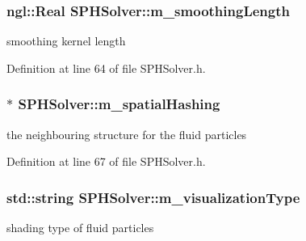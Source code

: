 \hypertarget{class_s_p_h_solver_a09a49a1460b8d9d311c177bb61d614fc}{
\subsubsection[{m\_\-smoothingLength}]{\setlength{\rightskip}{0pt plus 5cm}ngl::Real {\bf SPHSolver::m\_\-smoothingLength}}}
\label{class_s_p_h_solver_a09a49a1460b8d9d311c177bb61d614fc}


smoothing kernel length 



Definition at line 64 of file SPHSolver.h.

\hypertarget{class_s_p_h_solver_a1743796456c478d5e444d83384bef1dd}{
\subsubsection[{m\_\-spatialHashing}]{$\ast$ {\bf SPHSolver::m\_\-spatialHashing}}}
\label{class_s_p_h_solver_a1743796456c478d5e444d83384bef1dd}


the neighbouring structure for the fluid particles 



Definition at line 67 of file SPHSolver.h.

\hypertarget{class_s_p_h_solver_a60c10a0a436f307626d3422fb05809ce}{
\subsubsection[{m\_\-visualizationType}]{\setlength{\rightskip}{0pt plus 5cm}std::string {\bf SPHSolver::m\_\-visualizationType}}}
\label{class_s_p_h_solver_a60c10a0a436f307626d3422fb05809ce}


shading type of fluid particles 



